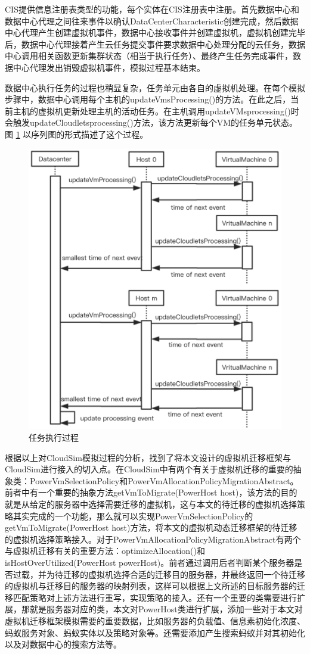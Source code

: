CIS提供信息注册表类型的功能，每个实体在CIS注册表中注册。首先数据中心和数据中心代理之间往来事件以确认DataCenterCharacteristic创建完成，然后数据中心代理产生创建虚拟机事件，数据中心接收事件并创建虚拟机，虚拟机创建完毕后，数据中心代理接着产生云任务提交事件要求数据中心处理分配的云任务，数据中心调用相关函数更新集群状态（相当于执行任务）、最终产生任务完成事件，数据中心代理发出销毁虚拟机事件，模拟过程基本结束。

数据中心执行任务的过程也稍显复杂，任务单元由各自的虚拟机处理。在每个模拟步骤中，数据中心调用每个主机的updateVmsProcessing()的方法。在此之后，当前主机的虚拟机更新处理主机的活动任务。在主机调用updateVMsprocessing()时会触发updateCloudletsprocessing()方法，该方法更新每个VM的任务单元状态。图 \ref{Fig:chap4_3} 以序列图的形式描述了这个过程。

\begin{figure}[htb]
  \centering
  \includegraphics[width=0.6\linewidth]{./Figure/IMG_Chap4_3.png}
  \caption{任务执行过程}\label{Fig:chap4_3}
\end{figure}

根据以上对CloudSim模拟过程的分析，找到了将本文设计的虚拟机迁移框架与CloudSim进行接入的切入点。在CloudSim中有两个有关于虚拟机迁移的重要的抽象类：PowerVmSelectionPolicy和PowerVmAllocationPolicyMigrationAbstract。前者中有一个重要的抽象方法getVmToMigrate(PowerHost host)，该方法的目的就是从给定的服务器中选择需要迁移的虚拟机，这与本文的待迁移的虚拟机选择策略其实完成的一个功能，那么就可以实现PowerVmSelectionPolicy的getVmToMigrate(PowerHost host)方法，将本文的虚拟机动态迁移框架的待迁移的虚拟机选择策略接入。对于PowerVmAllocationPolicyMigrationAbstract有两个与虚拟机迁移有关的重要方法：optimizeAllocation()和 isHostOverUtilized(PowerHost powerHost)。前者通过调用后者判断某个服务器是否过载，并为待迁移的虚拟机选择合适的迁移目的服务器，并最终返回一个待迁移的虚拟机与迁移目的服务器的映射列表，这样可以根据上文所述的目标服务器的迁移匹配策略对上述方法进行重写，实现策略的接入。还有一个重要的类需要进行扩展，那就是服务器对应的类，本文对PowerHost类进行扩展，添加一些对于本文对虚拟机迁移框架模拟需要的重要数据，比如服务器的负载值、信息素初始化浓度、蚂蚁服务对象、蚂蚁实体以及策略对象等。还需要添加产生搜索蚂蚁并对其初始化以及对数据中心的搜索方法等。

